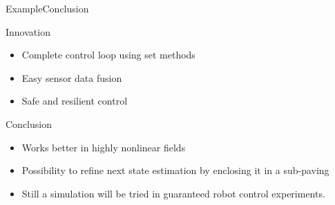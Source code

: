 \documentclass[9pt, xcolor={usenames, dvipsnames}]{beamer}
\begin{document}
			\begin{frame}{Example}{Conclusion}
				\centering
				\begin{minipage}[c]{0.6\textwidth}
					\begin{block}{Innovation}
						\begin{itemize}
							\item Complete control loop using set methods
							\item Easy sensor data fusion
							\item Safe and resilient control
						\end{itemize}
					\end{block}
					\begin{block}{Conclusion}
						\begin{itemize}
							\item Works better in highly nonlinear fields
							\item Possibility to refine next state estimation by enclosing it in a sub-paving
							\item Still a simulation will be tried in guaranteed robot control experiments.
						\end{itemize}
					\end{block}
				\end{minipage}
				\hfill
				\begin{minipage}[c]{0.3\textwidth}
					\begin{figure}

\end{figure}
\end{minipage}
\end{frame}
\end{document}
